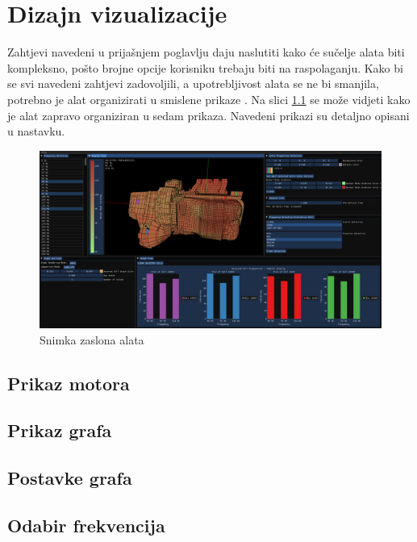 \documentclass[times, utf8, diplomski]{fer}
\begin{document}
\chapter{Dizajn vizualizacije}

Zahtjevi navedeni u prijašnjem poglavlju daju naslutiti kako će sučelje alata biti kompleksno, pošto brojne opcije korisniku trebaju biti na raspolaganju. Kako bi se svi navedeni zahtjevi zadovoljili, a upotrebljivost alata se ne bi smanjila, potrebno je alat organizirati u smislene prikaze . Na slici \ref{fig:gen-screen} se može vidjeti kako je alat zapravo organiziran u sedam prikaza. Navedeni prikazi su detaljno opisani u nastavku.\\

\begin{figure}[htb]
\centering
\includegraphics[width=15cm]{resources/images/general_screenshot.png}
\caption{Snimka zaslona alata}
\label{fig:gen-screen}
\end{figure}


\section{Prikaz motora}

\section{Prikaz grafa}

\section{Postavke grafa}

\section{Odabir frekvencija}
\end{document}
